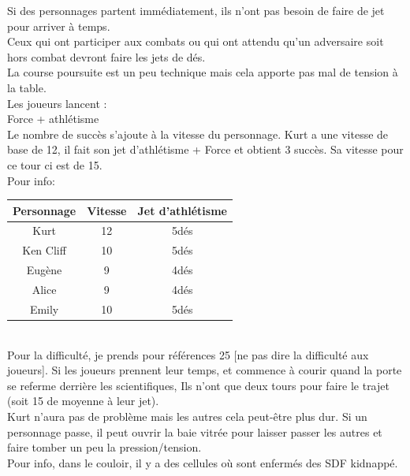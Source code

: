 \documentclass[oneside,12pt]{book}
\begin{document}
\begin{flushleft}
\vspace{0.5cm}
Si des personnages partent immédiatement, ils n'ont pas besoin de faire de jet pour arriver à temps.\\
Ceux qui ont participer aux combats ou qui ont attendu qu'un adversaire soit hors combat devront faire les jets de dés.\\


\vspace{0.5cm}
La course poursuite est un peu technique mais cela apporte pas mal de tension à la table.\\
Les joueurs lancent :\\
Force + athlétisme\\


\vspace{0.5cm}
Le nombre de succès s'ajoute à la vitesse du personnage. Kurt a une vitesse de base de 12, il fait son jet d'athlétisme + Force et obtient 3 succès. Sa vitesse pour ce tour ci est de 15.\\ 
Pour info:\\ 
\begin{tabular}{|c|c|c|}
\hline 
Personnage & Vitesse & Jet d'athlétisme \\ 
\hline 
Kurt & 12 & 5dés \\ 
\hline 
Ken Cliff & 10 & 5dés \\ 
\hline 
Eugène & 9 & 4dés \\ 
\hline 
Alice & 9 & 4dés \\ 
\hline 
Emily & 10 & 5dés \\ 
\hline 
\end{tabular} 
\\
\vspace{0.5cm}
Pour la difficulté, je prends pour références 25 [ne pas dire la difficulté aux joueurs]. Si les joueurs prennent leur temps, et commence à courir quand la porte se referme derrière les scientifiques, Ils n'ont que deux tours pour faire le trajet (soit 15 de moyenne à leur jet).\\
Kurt n'aura pas de problème mais les autres cela peut-être plus dur. Si un personnage passe, il peut ouvrir la baie vitrée pour laisser passer les autres et faire tomber un peu la pression/tension.\\
\vspace{0.5cm}
Pour info, dans le couloir, il y a des cellules où sont enfermés des SDF kidnappé.\\


\end{flushleft}
\end{document}
